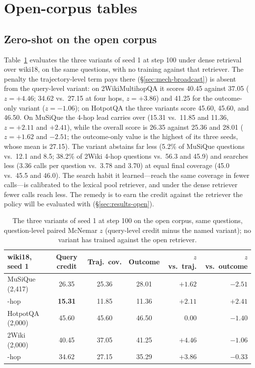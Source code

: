 \section{Open-corpus tables}
\label{app:open-tables}

\subsection{Zero-shot on the open corpus}
\label{app:open-zeroshot}
Table~\ref{tab:open-qc} evaluates the three variants of seed 1 at step 100
under dense retrieval over wiki18, on the same questions, with no
training against that retriever. The penalty the trajectory-level term
pays there (\S\ref{sec:mech-broadcast}) is absent from the query-level
variant: on 2WikiMultihopQA it scores 40.45 against 37.05 ($z=+4.46$; 34.62
vs.\ 27.15 at four hops, $z=+3.86$) and 41.25 for the outcome-only variant
($z=-1.06$); on HotpotQA the three variants score 45.60, 45.60, and 46.50.
On MuSiQue the 4-hop lead carries over (15.31 vs.\ 11.85 and 11.36,
$z=+2.11$ and $+2.41$), while the overall score is 26.35 against 25.36
and 28.01 ($z=+1.62$ and $-2.51$; the outcome-only value is the highest
of its three seeds, whose mean is 27.15). The variant abstains far less
(5.2\% of MuSiQue questions vs.\ 12.1 and 8.5; 38.2\% of 2Wiki 4-hop
questions vs.\ 56.3 and 45.9) and searches less (3.36 calls per
question vs.\ 3.78 and 3.70) at equal final coverage (45.0 vs.\ 45.5
and 46.0). The search habit it learned---reach the same coverage in
fewer calls---is calibrated to the lexical pool retriever, and under
the dense retriever fewer calls reach less. The remedy is to earn the
credit against the retriever the policy will be evaluated with
(\S\ref{sec:results-open}).

\begin{table}[t]
\centering
\small
\begin{tabular}{lcccrr}
\toprule
wiki18, seed 1 & Query credit & Traj.\ cov. & Outcome & $z$ vs.\ traj. & $z$ vs.\ outcome \\
\midrule
MuSiQue (2{,}417)  & 26.35 & 25.36 & 28.01 & $+1.62$ & $-2.51$ \\
\quad 4-hop        & \textbf{15.31} & 11.85 & 11.36 & $+2.11$ & $+2.41$ \\
HotpotQA (2{,}000) & 45.60 & 45.60 & 46.50 & $0.00$ & $-1.40$ \\
2Wiki (2{,}000)    & 40.45 & 37.05 & 41.25 & $+4.46$ & $-1.06$ \\
\quad 4-hop        & 34.62 & 27.15 & 35.29 & $+3.86$ & $-0.33$ \\
\bottomrule
\end{tabular}
\caption{The three variants of seed 1 at step 100 on the open corpus, same
questions, question-level paired McNemar $z$ (query-level credit minus
the named variant); no variant has trained against the open retriever.}
\label{tab:open-qc}
\end{table}

